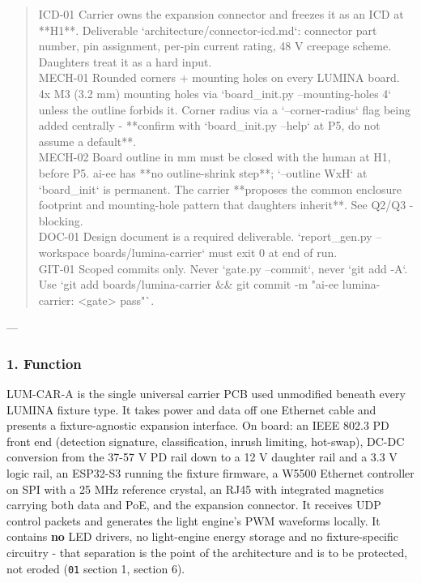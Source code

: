 \documentclass[11pt,a4paper]{article}
\begin{document}
\begin{quote}
\textbar{} ICD-01 \textbar{} Carrier owns the expansion connector and freezes it as an ICD at {*}{*}H1{*}{*}. \textbar{} Deliverable `architecture/connector-icd.md`: connector part number, pin assignment, per-pin current rating, 48 V creepage scheme. Daughters treat it as a hard input. \textbar{}\\
\textbar{} MECH-01 \textbar{} Rounded corners + mounting holes on every LUMINA board. \textbar{} 4x M3 (3.2 mm) mounting holes via `board\_init.py --mounting-holes 4` unless the outline forbids it. Corner radius via a `--corner-radius` flag being added centrally - {*}{*}confirm with `board\_init.py --help` at P5, do not assume a default{*}{*}. \textbar{}\\
\textbar{} MECH-02 \textbar{} Board outline in mm must be closed with the human at H1, before P5. \textbar{} ai-ee has {*}{*}no outline-shrink step{*}{*}; `--outline WxH` at `board\_init` is permanent. The carrier {*}{*}proposes the common enclosure footprint and mounting-hole pattern that daughters inherit{*}{*}. See Q2/Q3 - blocking. \textbar{}\\
\textbar{} DOC-01 \textbar{} Design document is a required deliverable. \textbar{} `report\_gen.py --workspace boards/lumina-carrier` must exit 0 at end of run. \textbar{}\\
\textbar{} GIT-01 \textbar{} Scoped commits only. \textbar{} Never `gate.py --commit`, never `git add -A`. Use `git add boards/lumina-carrier \&\& git commit -m "ai-ee lumina-carrier: \textless{}gate\textgreater{} pass"`. \textbar{}
\end{quote}
---

\subsubsection*{1. Function}
LUM-CAR-A is the single universal carrier PCB used unmodified beneath every LUMINA fixture type. It takes power and data off one Ethernet cable and presents a fixture-agnostic expansion interface. On board: an IEEE 802.3 PD front end (detection signature, classification, inrush limiting, hot-swap), DC-DC conversion from the 37-57 V PD rail down to a 12 V daughter rail and a 3.3 V logic rail, an ESP32-S3 running the fixture firmware, a W5500 Ethernet controller on SPI with a 25 MHz reference crystal, an RJ45 with integrated magnetics carrying both data and PoE, and the expansion connector. It receives UDP control packets and generates the light engine's PWM waveforms locally. It contains \textbf{no} LED drivers, no light-engine energy storage and no fixture-specific circuitry - that separation is the point of the architecture and is to be protected, not eroded (\texttt{01} section 1, section 6).
\end{document}
